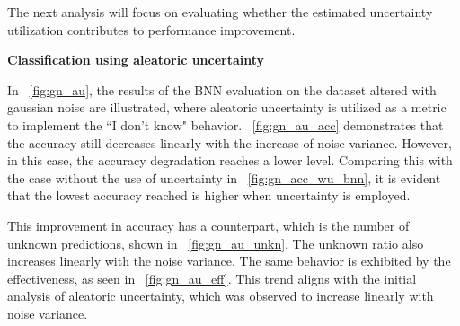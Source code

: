 The next analysis will focus on evaluating whether the estimated uncertainty utilization contributes to performance improvement.

\vspace{0.3cm}
\textbf{Classification using aleatoric uncertainty}
\vspace{0.1cm}

In \Fig~\ref{fig:gn_au}, the results of the BNN evaluation on the dataset altered with gaussian noise are illustrated, where aleatoric uncertainty is utilized as a metric to implement the ``I don't know" behavior. \Fig~\ref{fig:gn_au_acc} demonstrates that the accuracy still decreases linearly with the increase of noise variance. However, in this case, the accuracy degradation reaches a lower level. Comparing this with the case without the use of uncertainty in \Fig~\ref{fig:gn_acc_wu_bnn}, it is evident that the lowest accuracy reached is higher when uncertainty is employed.

This improvement in accuracy has a counterpart, which is the number of unknown predictions, shown in \Fig~\ref{fig:gn_au_unkn}. The unknown ratio also increases linearly with the noise variance. The same behavior is exhibited by the effectiveness, as seen in \Fig~\ref{fig:gn_au_eff}. This trend aligns with the initial analysis of aleatoric uncertainty, which was observed to increase linearly with noise variance.


